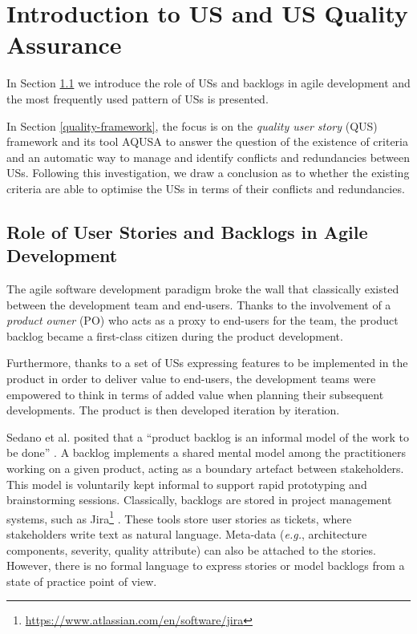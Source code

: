 \section{Introduction to US and US Quality Assurance}\label{introduction_to_us}
In Section \ref{us} we introduce the role of USs and backlogs in agile development and the most frequently used pattern of USs is presented. 

In Section \ref{quality-framework}, the focus is on the \emph{quality user story} (QUS) framework and its tool AQUSA to answer the question of the existence of criteria and an automatic way to manage and identify conflicts and redundancies between USs. Following this investigation, we draw a conclusion as to whether the existing criteria are able to optimise the USs in terms of their conflicts and redundancies.

\subsection{Role of User Stories and Backlogs in Agile Development}\label{us}
The agile software development paradigm broke the wall that classically existed between the development team and end-users. Thanks to the involvement of a \emph{product owner} (PO) who acts as a proxy to end-users for the team, the product backlog \cite{sedano2019product} became a first-class citizen during the product development. 

Furthermore, thanks to a set of USs expressing features to be implemented in the product in order to deliver value to end-users, the development teams were empowered to think in terms of added value when planning their subsequent developments. The product is then developed iteration by iteration. 

Sedano et al. posited that a \enquote{product backlog is an informal model of the work to be done} \cite{sedano2019product}. A backlog implements a shared mental model among the practitioners working on a given product, acting as a boundary artefact between stakeholders. This model is voluntarily kept informal to support rapid prototyping and brainstorming sessions. Classically, backlogs are stored in project management systems, such as Jira\footnote{\href{https://www.atlassian.com/en/software/jira}{https://www.atlassian.com/en/software/jira}} . These tools store user stories as tickets, where stakeholders write text as natural language. Meta-data (\emph{e.g.}, architecture components, severity, quality attribute) can also be attached to the stories. However, there is no formal language to express stories or model backlogs from a state of practice point of view.

